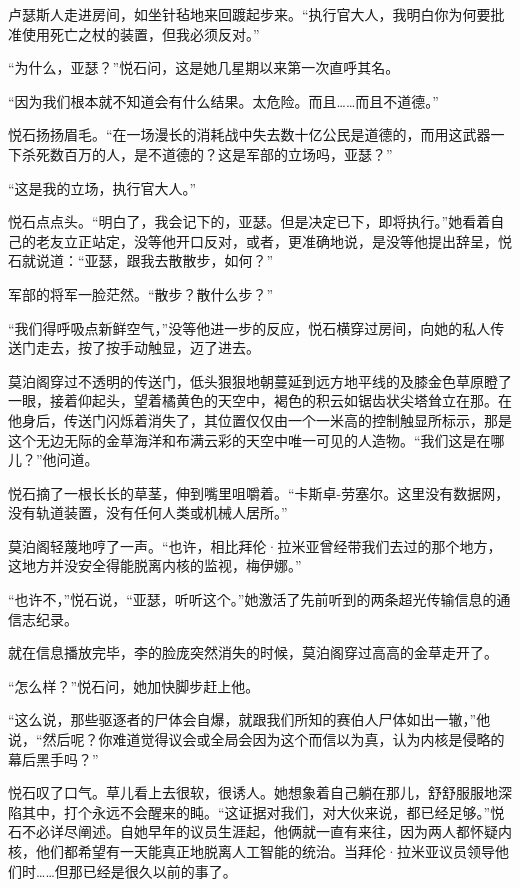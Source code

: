 \documentclass[AutoFakeBold=true]{book}
\begin{document}
卢瑟斯人走进房间，如坐针毡地来回踱起步来。``执行官大人，我明白你为何要批准使用死亡之杖的装置，但我必须反对。''

``为什么，亚瑟？''悦石问，这是她几星期以来第一次直呼其名。

``因为我们根本就不知道会有什么结果。太危险。而且……而且不道德。''

悦石扬扬眉毛。``在一场漫长的消耗战中失去数十亿公民是道德的，而用这武器一下杀死数百万的人，是不道德的？这是军部的立场吗，亚瑟？''

``这是我的立场，执行官大人。''

悦石点点头。``明白了，我会记下的，亚瑟。但是决定已下，即将执行。''她看着自己的老友立正站定，没等他开口反对，或者，更准确地说，是没等他提出辞呈，悦石就说道：``亚瑟，跟我去散散步，如何？''

军部的将军一脸茫然。``散步？散什么步？''

``我们得呼吸点新鲜空气，''没等他进一步的反应，悦石横穿过房间，向她的私人传送门走去，按了按手动触显，迈了进去。

莫泊阁穿过不透明的传送门，低头狠狠地朝蔓延到远方地平线的及膝金色草原瞪了一眼，接着仰起头，望着橘黄色的天空中，褐色的积云如锯齿状尖塔耸立在那。在他身后，传送门闪烁着消失了，其位置仅仅由一个一米高的控制触显所标示，那是这个无边无际的金草海洋和布满云彩的天空中唯一可见的人造物。``我们这是在哪儿？''他问道。

悦石摘了一根长长的草茎，伸到嘴里咀嚼着。``卡斯卓-劳塞尔。这里没有数据网，没有轨道装置，没有任何人类或机械人居所。''

莫泊阁轻蔑地哼了一声。``也许，相比拜伦·拉米亚曾经带我们去过的那个地方，这地方并没安全得能脱离内核的监视，梅伊娜。''

``也许不，''悦石说，``亚瑟，听听这个。''她激活了先前听到的两条超光传输信息的通信志纪录。

就在信息播放完毕，李的脸庞突然消失的时候，莫泊阁穿过高高的金草走开了。

``怎么样？''悦石问，她加快脚步赶上他。

``这么说，那些驱逐者的尸体会自爆，就跟我们所知的赛伯人尸体如出一辙，''他说，``然后呢？你难道觉得议会或全局会因为这个而信以为真，认为内核是侵略的幕后黑手吗？''

悦石叹了口气。草儿看上去很软，很诱人。她想象着自己躺在那儿，舒舒服服地深陷其中，打个永远不会醒来的盹。``这证据对我们，对大伙来说，都已经足够。''悦石不必详尽阐述。自她早年的议员生涯起，他俩就一直有来往，因为两人都怀疑内核，他们都希望有一天能真正地脱离人工智能的统治。当拜伦·拉米亚议员领导他们时……但那已经是很久以前的事了。
\end{document}
